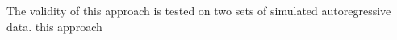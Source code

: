 \documentclass[12pt]{article}
\begin{document}
The validity of this approach is tested on two sets of simulated autoregressive data. this approach

\end{document}
